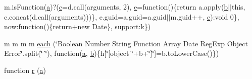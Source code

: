 \begin{DoxyCompactItemize}
m.\+is\+Function(\hyperlink{_admin_2assets_2js_2bootstrap_8min_8js_a1f5870dcf487187f13d5fd328ed9e6e7}{a})?(\hyperlink{_admin_2assets_2js_2bootstrap_8min_8js_ad9d1ac02e33c4aed62ad517a7cb8b3fb}{c}=d.\+call(arguments, 2), \hyperlink{_admin_2assets_2js_2bootstrap_8min_8js_ab5902775854a8b8440bcd25e0fe1c120}{e}=function()\{return a.\+apply(\hyperlink{_admin_2assets_2js_2bootstrap_8min_8js_a398bb8542498d1b14178b02b99df309b}{b}$\vert$$\vert$this, c.\+concat(d.\+call(arguments)))\}, e.\+guid=a.\+guid=a.\+guid$\vert$$\vert$m.\+guid++, \hyperlink{_admin_2assets_2js_2bootstrap_8min_8js_ab5902775854a8b8440bcd25e0fe1c120}{e})\+:void 0\}, now\+:function()\{return+new Date\}, support\+:k\})
\item 
m m m m \hyperlink{assets_2js_2jquery-1_811_82_8min_8js_a18d9b499a0765bf2fe5f372ff2fc0236}{each} (\char`\"{}Boolean Number String Function Array Date Reg\+Exp Object Error\char`\"{}.split(\char`\"{} \char`\"{}), function(\hyperlink{_admin_2assets_2js_2bootstrap_8min_8js_a1f5870dcf487187f13d5fd328ed9e6e7}{a}, \hyperlink{_admin_2assets_2js_2bootstrap_8min_8js_a398bb8542498d1b14178b02b99df309b}{b})\{h\mbox{[}\char`\"{}\mbox{[}object \char`\"{}+b+\char`\"{}\mbox{]}\char`\"{}\mbox{]}=b.\+to\+Lower\+Case()\})
\item 
function \hyperlink{assets_2js_2jquery-1_811_82_8min_8js_a96f65b399314d93896076ceb474b6b9b}{r} (\hyperlink{_admin_2assets_2js_2bootstrap_8min_8js_a1f5870dcf487187f13d5fd328ed9e6e7}{a})
\end{DoxyCompactItemize}
